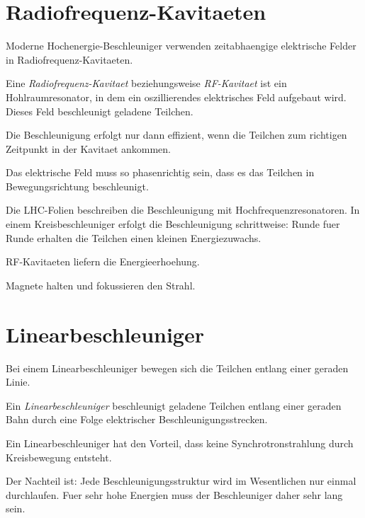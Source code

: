 \section{Radiofrequenz-Kavitaeten}

Moderne Hochenergie-Beschleuniger verwenden zeitabhaengige elektrische Felder in
Radiofrequenz-Kavitaeten.

\begin{definitionbox}
Eine \emph{Radiofrequenz-Kavitaet} beziehungsweise \emph{RF-Kavitaet} ist ein
Hohlraumresonator, in dem ein oszillierendes elektrisches Feld aufgebaut wird.
Dieses Feld beschleunigt geladene Teilchen.
\end{definitionbox}

\begin{conceptbox}
Die Beschleunigung erfolgt nur dann effizient, wenn die Teilchen zum richtigen
Zeitpunkt in der Kavitaet ankommen.

Das elektrische Feld muss so phasenrichtig sein, dass es das Teilchen in
Bewegungsrichtung beschleunigt.
\end{conceptbox}

\begin{notebox}
Die LHC-Folien beschreiben die Beschleunigung mit Hochfrequenzresonatoren.
In einem Kreisbeschleuniger erfolgt die Beschleunigung schrittweise:
Runde fuer Runde erhalten die Teilchen einen kleinen Energiezuwachs.
\end{notebox}

\begin{examtipbox}
RF-Kavitaeten liefern die Energieerhoehung.

Magnete halten und fokussieren den Strahl.
\end{examtipbox}

\section{Linearbeschleuniger}

Bei einem Linearbeschleuniger bewegen sich die Teilchen entlang einer geraden Linie.

\begin{definitionbox}
Ein \emph{Linearbeschleuniger} beschleunigt geladene Teilchen entlang einer geraden
Bahn durch eine Folge elektrischer Beschleunigungsstrecken.
\end{definitionbox}

\begin{conceptbox}
Ein Linearbeschleuniger hat den Vorteil, dass keine Synchrotronstrahlung durch
Kreisbewegung entsteht.

Der Nachteil ist:
Jede Beschleunigungsstruktur wird im Wesentlichen nur einmal durchlaufen.
Fuer sehr hohe Energien muss der Beschleuniger daher sehr lang sein.
\end{conceptbox}

